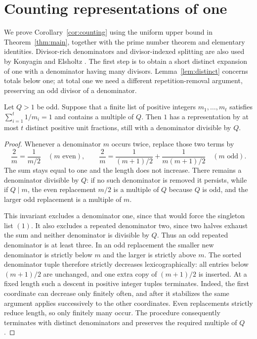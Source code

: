 \section{Counting representations of one}\label{sec:counting}

We prove Corollary~\ref{cor:counting} using the uniform upper bound
in Theorem~\ref{thm:main}, together with the prime number theorem and
elementary identities. Divisor-rich denominators and divisor-indexed
splitting are also used by Konyagin and Elsholtz
\cite{Konyagin2014,Elsholtz2016}. The first step is
to obtain a short distinct expansion of one with a denominator having
many divisors. Lemma~\ref{lem:distinct} concerns totals below one; at
total one we need a different repetition-removal argument, preserving
an odd divisor of a denominator.

\begin{lemma}\label{lem:marked-cleanup}
Let $Q>1$ be odd. Suppose that a finite list of positive integers
$m_1,\ldots,m_t$ satisfies $\sum_{i=1}^t1/m_i=1$ and contains a
multiple of $Q$. Then $1$ has a representation by at most $t$ distinct
positive unit fractions, still with a denominator divisible by $Q$.
\end{lemma}

\begin{proof}
Whenever a denominator $m$ occurs twice, replace those two terms by
\[
 \frac2m=\frac1{m/2}\quad(m\text{ even}),
 \qquad
 \frac2m=\frac1{(m+1)/2}+\frac1{m(m+1)/2}
       \quad(m\text{ odd}).
\]
The sum stays equal to one and the length does not increase.
There remains a denominator divisible by $Q$: if no such denominator
is removed it persists, while if $Q\mid m$, the even replacement
$m/2$ is a multiple of $Q$ because $Q$ is odd, and the larger odd
replacement is a multiple of $m$.

This invariant excludes a denominator one, since that would force the
singleton list $(1)$. It also excludes a repeated denominator two,
since two halves exhaust the sum and neither denominator is divisible
by $Q$. Thus an odd repeated denominator is at least three. In an odd
replacement the smaller new denominator is strictly below $m$ and the
larger is strictly above $m$. The sorted denominator tuple therefore
strictly decreases lexicographically: all entries below $(m+1)/2$
are unchanged, and one extra copy of $(m+1)/2$ is inserted.
At a fixed length such a descent in positive integer tuples terminates.
Indeed, the first coordinate can decrease only finitely often, and
after it stabilizes the same argument applies successively to the other
coordinates. Even replacements strictly reduce length, so only finitely
many occur. The procedure consequently terminates with distinct
denominators and preserves the required multiple of $Q$.
\end{proof}

